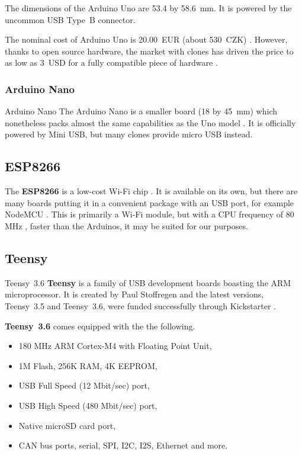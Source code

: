                 The dimensions of the Arduino Uno are 53.4 by 58.6~mm.  It is powered by the uncommon USB Type~B connector.
                
                The nominal cost of Arduino Uno is 20.00~EUR (about 530~CZK) \cite{arduino-uno-store}.  However, thanks to open source hardware, the market with clones has driven the price to as low as 3~USD for a fully compatible piece of hardware \cite{arduino-aliexpress-uno-clone}.
            
            \subsubsection{Arduino Nano}
                    {Arduino Nano  \cite{arduino-nano-robotics}}
                The Arduino Nano is a smaller board (18 by 45~mm) which nonetheless packs almost the same capabilities as the Uno model \cite{arduino-nano}.  It is officially powered by Mini USB, but many clones provide micro USB instead.
                    
            
        \subsection{ESP8266}
            The \textbf{ESP8266} is a low-cost Wi-Fi chip \cite{espressif-esp8266}.  It is available on its own, but there are many boards putting it in a convenient package with an USB port, for example NodeMCU \cite{nodemcu}.  This is primarily a Wi-Fi module, but with a CPU frequency of 80 MHz \cite{platformio-esp8266}, faster than the Arduinos, it may be suited for our purposes.
        \subsection{Teensy}
                {Teensy~3.6  \cite{teensy-36-sparkfun}}
            \textbf{Teensy} is a family of USB development boards boasting the ARM microprocessor.  It is created by Paul Stoffregen and the latest versions, Teensy~3.5 and Teensy~3.6, were funded successfully through Kickstarter \cite{teensy-35-36-kickstarter}.
            
            \textbf{Teensy~3.6} comes equipped with the the following.
            
            \begin{itemize}
                \item 180 MHz ARM Cortex-M4 with Floating Point Unit,
                \item 1M Flash, 256K RAM, 4K EEPROM,
                \item USB Full Speed (12 Mbit/sec) port,
                \item USB High Speed (480 Mbit/sec) port,
                \item Native microSD card port,
                \item CAN bus ports, serial, SPI, I2C, I2S, Ethernet and more.
            \end{itemize}
            
